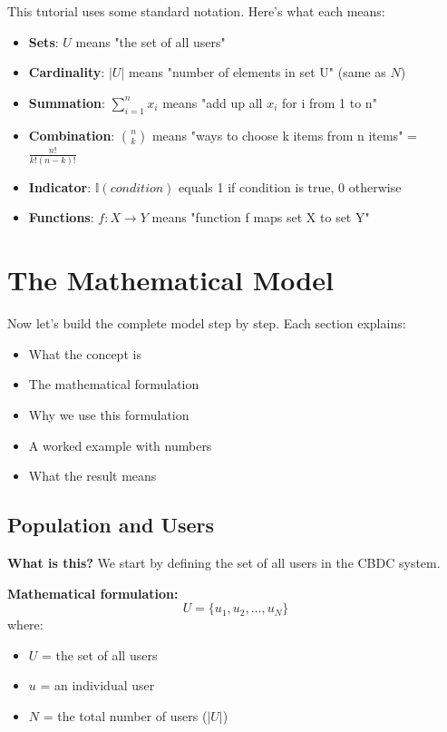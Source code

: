 \documentclass[12pt,a4paper,oneside,openany]{report}
\begin{document}
This tutorial uses some standard notation. Here's what each means:

\begin{itemize}
    \item \textbf{Sets}: $U$ means "the set of all users"
    \item \textbf{Cardinality}: $|U|$ means "number of elements in set U" (same as $N$)
    \item \textbf{Summation}: $\sum_{i=1}^{n} x_i$ means "add up all $x_i$ for i from 1 to n"
    \item \textbf{Combination}: $\binom{n}{k}$ means "ways to choose k items from n items" = $\frac{n!}{k!(n-k)!}$
    \item \textbf{Indicator}: $\mathbb{I}(condition)$ equals 1 if condition is true, 0 otherwise
    \item \textbf{Functions}: $f: X \rightarrow Y$ means "function f maps set X to set Y"
\end{itemize}

\chapter{The Mathematical Model}
\label{chap:model}

Now let's build the complete model step by step. Each section explains:
\begin{itemize}
    \item What the concept is
    \item The mathematical formulation
    \item Why we use this formulation
    \item A worked example with numbers
    \item What the result means
\end{itemize}

\section{Population and Users}
\label{sec:population}

\textbf{What is this?} We start by defining the set of all users in the CBDC system.

\textbf{Mathematical formulation:}
\begin{equation}
U = \{u_1, u_2, \ldots, u_N\}
\end{equation}
where:
\begin{itemize}
    \item $U$ = the set of all users
    \item $u$ = an individual user
    \item $N$ = the total number of users ($|U|$)
\end{itemize}
\end{document}
